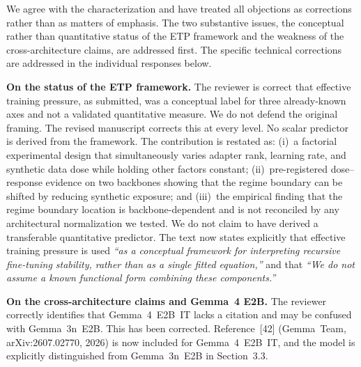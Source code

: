 \documentclass[11pt,a4paper]{article}
\begin{document}
We agree with the characterization and have treated all objections as
corrections rather than as matters of emphasis. The two substantive
issues, the conceptual rather than quantitative status of the ETP
framework and the weakness of the cross-architecture claims, are
addressed first. The specific technical corrections are addressed in
the individual responses below.

\textbf{On the status of the ETP framework.}
The reviewer is correct that effective training pressure, as submitted,
was a conceptual label for three already-known axes and not a validated
quantitative measure. We do not defend the original framing. The
revised manuscript corrects this at every level. No scalar predictor
is derived from the framework. The contribution is restated as: (i)~a
factorial experimental design that simultaneously varies adapter rank,
learning rate, and synthetic data dose while holding other factors
constant; (ii)~pre-registered dose--response evidence on two backbones
showing that the regime boundary can be shifted by reducing synthetic
exposure; and (iii)~the empirical finding that the regime boundary
location is backbone-dependent and is not reconciled by any
architectural normalization we tested. We do not claim to have derived
a transferable quantitative predictor. The text now states explicitly that effective training pressure is used \textit{``as a conceptual framework for interpreting recursive fine-tuning stability, rather than as a single fitted equation,''} and that \textit{``We do not assume a known functional form combining these components.''}

\textbf{On the cross-architecture claims and Gemma~4 E2B.}
The reviewer correctly identifies that Gemma~4~E2B~IT lacks a citation
and may be confused with Gemma~3n~E2B. This has been corrected.
Reference~[42] (Gemma~Team, arXiv:2607.02770, 2026) is now included
for Gemma~4~E2B~IT, and the model is explicitly distinguished from
Gemma~3n~E2B in Section~3.3.
\end{document}

